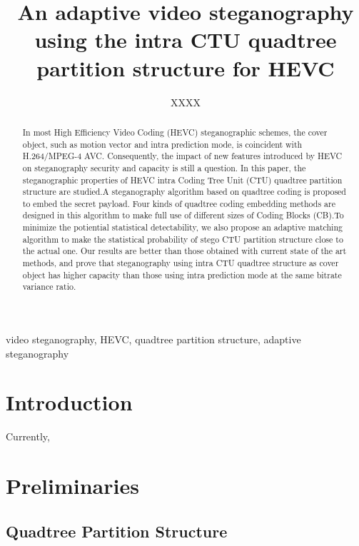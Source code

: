 \documentclass[journal,sort]{IEEEtran}
\begin{document}
\title{An adaptive video steganography using the intra CTU quadtree partition structure for HEVC}
\author{XXXX}
	

\maketitle

\begin{abstract}
In most High Efficiency Video Coding (HEVC) steganographic schemes, the cover object, such as motion vector and intra prediction mode, is coincident with H.264/MPEG-4 AVC. Consequently, the impact of new features introduced by HEVC on steganography security and capacity is still a question. In this paper, the steganographic properties of HEVC intra Coding Tree Unit (CTU) quadtree partition structure are studied.A steganography algorithm based on quadtree coding is proposed to embed the secret payload. Four kinds of quadtree coding embedding methods are designed in this algorithm to make full use of different sizes of Coding Blocks (CB).To minimize the potiential statistical detectability, we also propose an adaptive matching algorithm to make the statistical probability of stego CTU partition structure close to the actual one. Our results are better
than those obtained with current state of the art methods, and prove that steganography using intra CTU quadtree structure as cover object has higher capacity than those using intra prediction mode at the same bitrate variance ratio.

	
	
\end{abstract}	
\begin{IEEEkeywords}
		video steganography, HEVC, quadtree partition structure, adaptive steganography
\end{IEEEkeywords}
	
\section{Introduction\label{intro}}
	
Currently,



\section{Preliminaries}

\subsection{Quadtree Partition Structure}
\end{document}

